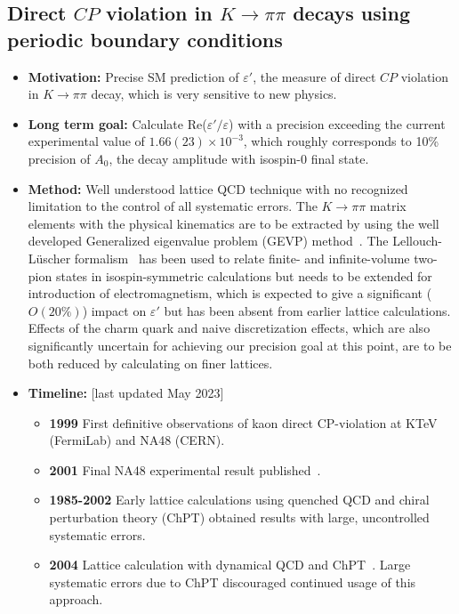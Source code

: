 \documentclass[12pt,hyperpdf]{article}
\begin{document}
\subsection{Direct $CP$ violation in $K\to\pi\pi$ decays using periodic boundary conditions}
\begin{itemize}
    \item{\bf Motivation:} Precise SM prediction of $\varepsilon'$, the measure of direct $CP$ violation in $K\to\pi\pi$ decay, which is very sensitive to new physics. 
    \item{\bf Long term goal:} Calculate Re($\varepsilon'/\varepsilon$) with
      a precision exceeding the current experimental value of $1.66(23)\times10^{-3}$, which roughly corresponds to 10\% precision of $A_0$, the decay amplitude with isospin-0 final state.
    \item{\bf Method:} Well understood lattice QCD technique with no
      recognized limitation to the control of all systematic
      errors. The $K\to\pi\pi$ matrix elements with the physical kinematics are to be
      extracted by using the well developed Generalized eigenvalue problem (GEVP)
      method~\cite{Luscher:1990ck,Bulava:2011yz}.  The Lellouch-L\"uscher
      formalism~\cite{Lellouch:2000pv} has been used to relate finite- and
      infinite-volume two-pion states in isospin-symmetric calculations but
      needs to be extended for introduction of electromagnetism, which is
      expected to give a significant ($O(20\%)$) impact on $\varepsilon'$
      but has been absent from earlier lattice calculations.  Effects of the
      charm quark and naive discretization effects, which are also significantly
      uncertain for achieving our precision goal at this point, are to be both
      reduced by calculating on finer lattices.
\item{\bf Timeline:} \hfill [last updated May 2023]
\begin{itemize}
    \item{\bf 1999} First definitive observations of kaon direct CP-violation at KTeV (FermiLab) and NA48 (CERN).
    \item{\bf 2001} Final NA48 experimental result published~\cite{NA48:2001bct}.
    \item{\bf 1985-2002} Early lattice calculations using quenched QCD and chiral perturbation theory (ChPT) obtained results with large, uncontrolled systematic errors.
    \item{\bf 2004} Lattice calculation with dynamical QCD and ChPT~\cite{Li:2008kc}. Large systematic errors due to ChPT discouraged continued usage of this approach.

\end{itemize}
\end{itemize}
\end{document}
